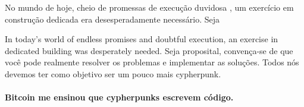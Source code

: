 No mundo de hoje, cheio de promessas de execução duvidosa , um exercício em construção dedicada 
era desesperadamente necessário. Seja 

In today's world of endless promises and doubtful execution, an exercise
in dedicated building was desperately needed. Seja proposital, convença-se 
de que você pode realmente resolver os problemas e implementar as soluções. 
Todos nós devemos ter como objetivo ser um pouco mais cypherpunk. 

\paragraph{Bitcoin me ensinou que cypherpunks escrevem código.}

%
%
%
%
